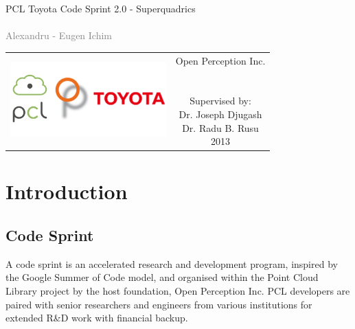 \documentclass{article}
\begin{document}
\begin{titlepage}
\begin{center}
\sffamily


\null\vspace{2cm}
{\huge PCL Toyota Code Sprint 2.0 - Superquadrics} \\[24pt]
\textcolor{gray}{{\\ Alexandru - Eugen Ichim}}
    
\vfill

\begin{tabular} {cc}
\hspace{1cm}
\parbox{0.4\textwidth}{\includegraphics[width=6cm]{figures/logos}}
\hspace{4cm}
&
\parbox{0.7\textwidth}{%
	Open Perception Inc. \\ \\ \\
%
\small
Supervised by:\\[4pt]
%
    Dr. Joseph Djugash\\
    Dr. Radu B. Rusu\\[12pt]
%
2013}
\end{tabular}
\end{center}
\vspace{2cm}
\end{titlepage}



\tableofcontents
\newpage

\section {Introduction}

\subsection {Code Sprint}
A code sprint is an accelerated research and development program, inspired by the Google Summer of Code model, and organised within the Point Cloud Library project by the host foundation, Open Perception Inc. PCL developers are paired with senior researchers and engineers from various institutions for extended R\&D work with financial backup.
\end{document}
